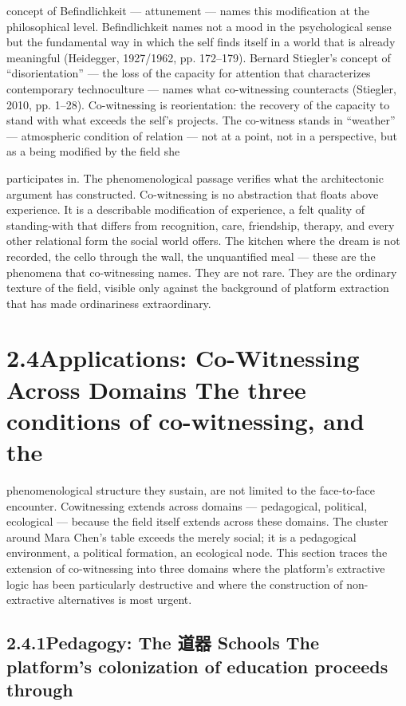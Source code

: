 concept of Befindlichkeit — attunement — names this modification at the philosophical level. Befindlichkeit names not a mood in the psychological sense but the fundamental way in which the self finds itself in a world that is already meaningful (Heidegger, 1927/1962, pp. 172–179). Bernard Stiegler’s concept of “disorientation” — the loss of the capacity for attention that characterizes contemporary technoculture — names what co-witnessing counteracts (Stiegler, 2010, pp. 1–28). Co-witnessing is reorientation: the recovery of the capacity to stand with what exceeds the self’s projects. The co-witness stands in “weather” — atmospheric condition of relation — not at a point, not in a perspective, but as a being modified by the field she

participates in. The phenomenological passage verifies what the architectonic argument has constructed. Co-witnessing is no abstraction that floats above experience. It is a describable modification of experience, a felt quality of standing-with that differs from recognition, care, friendship, therapy, and every other relational form the social world offers. The kitchen where the dream is not recorded, the cello through the wall, the unquantified meal — these are the phenomena that co-witnessing names. They are not rare. They are the ordinary texture of the field, visible only against the background of platform extraction that has made ordinariness extraordinary.

\section{2.4\quad Applications: Co-Witnessing Across Domains The three conditions of co-witnessing, and the}

phenomenological structure they sustain, are not limited to the face-to-face encounter. Cowitnessing extends across domains — pedagogical, political, ecological — because the field itself extends across these domains. The cluster around Mara Chen’s table exceeds the merely social; it is a pedagogical environment, a political formation, an ecological node. This section traces the extension of co-witnessing into three domains where the platform’s extractive logic has been particularly destructive and where the construction of non-extractive alternatives is most urgent.

\subsection{2.4.1\quad Pedagogy: The 道器 Schools The platform’s colonization of education proceeds through}

